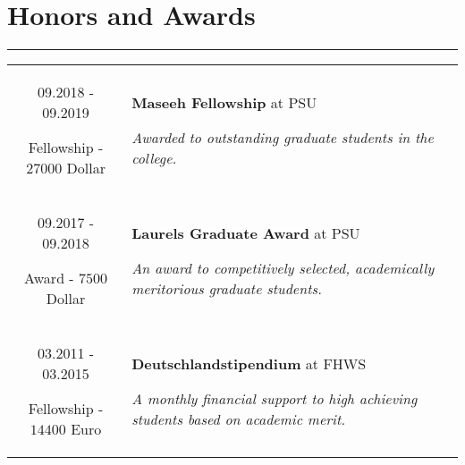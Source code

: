 \documentclass[10pt]{article}
\begin{document}
\section*{Honors and Awards}
\vspace{-0.3cm}
{\color{E6E6E6} \hrule height 0.04cm}
\vspace{0.4cm}
\renewcommand{\arraystretch}{1.0}
\begin{tabular}{C Z D}
	{
		09.2018 - 09.2019
		
		\vspace{-0.05cm}
		
		{\scriptsize Fellowship - \(27000\) Dollar}
	}
	&
	{
		{\bf Maseeh Fellowship} {\scriptsize at PSU}
		
		\vspace{0.05cm}
		
		{\scriptsize \it Awarded to outstanding graduate students in the college.}
		
		\vspace{0.0cm}
	}
	\\
	{
		09.2017 - 09.2018
		
		\vspace{-0.05cm}
		
		{\scriptsize Award - \(7500\) Dollar}
	}
	&
	{
		{\bf Laurels Graduate Award} {\scriptsize at PSU} %
		
		\vspace{0.05cm}
		
		{\scriptsize \it An award to competitively selected, academically meritorious graduate students.}
		
		\vspace{0.0cm}
	}
	\\
%		
%		
%		
%		
%		
	{
		03.2011 - 03.2015
		
		\vspace{-0.05cm}
		
		{\scriptsize Fellowship - \(14400\) Euro}
	}
	&
	{
		{\bf Deutschlandstipendium} {\scriptsize at FHWS}
		
		\vspace{0.05cm}
		
		{\scriptsize \it A monthly financial support to high achieving students based on academic merit.}
%		
	}
	\\
%		
%		
%		
%		
\end{tabular}
\end{document}
